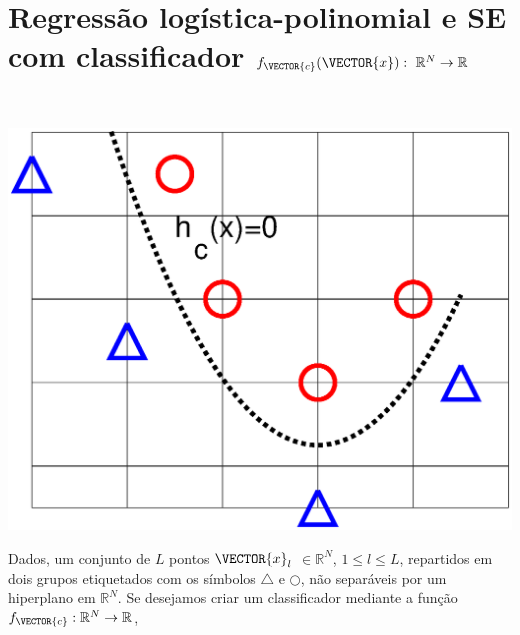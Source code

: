 \newpage

\section{Regressão logística-polinomial e SE com classificador $f_{\VECTOR{c}}(\VECTOR{x}):~\mathbb{R}^{N} \rightarrow \mathbb{R}$}
\label{sec:theo:reglogrnr1poly:1}


\begin{theorem}\label{theo:reglogrnr1poly:1}
~\\
\noindent
\begin{minipage}{0.45\textwidth}
\centering
\includegraphics[width=0.95\linewidth]{chapters/classificacao/mfiles/reglogrnr1poly/reglogrnr1poly.eps} 
\end{minipage}
\begin{minipage}{0.55\textwidth}
Dados, um conjunto de $L$ pontos
$\VECTOR{x}_l$ $\in \mathbb{R}^{N}$, $1\leq l \leq L$,
repartidos em dois grupos etiquetados com os símbolos $\bigtriangleup$ e $\bigcirc$,
não separáveis por um hiperplano  em $\mathbb{R}^{N}$.
Se desejamos criar um classificador mediante 
a função  $f_{\VECTOR{c}}:\mathbb{R}^{N} \rightarrow \mathbb{R}$,

\end{minipage}
\end{theorem}
